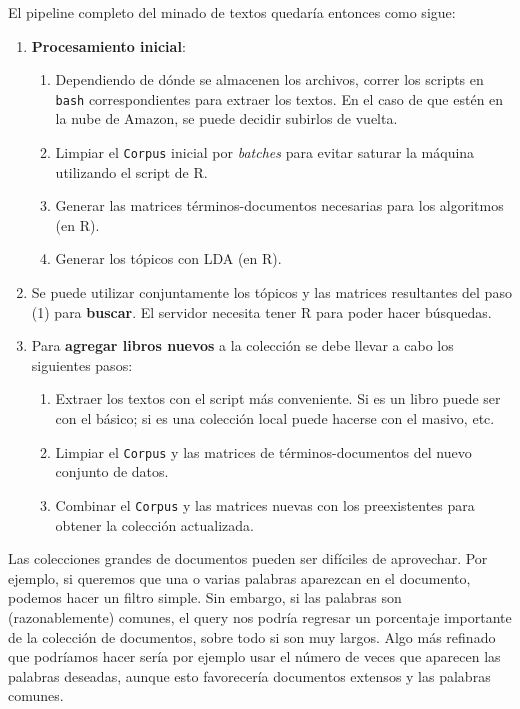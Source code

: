 El pipeline completo del minado de textos quedaría entonces como sigue:

\begin{enumerate}
\def\labelenumi{\arabic{enumi}.}
\itemsep1pt\parskip0pt
\item
  \textbf{Procesamiento inicial}:

  \begin{enumerate}
  \def\labelenumii{\alph{enumii}.}
  \itemsep1pt\parskip0pt
  \item
    Dependiendo de dónde se almacenen los archivos, correr los scripts
    en \texttt{bash} correspondientes para extraer los textos. En el
    caso de que estén en la nube de Amazon, se puede decidir subirlos de
    vuelta.
  \item
    Limpiar el \texttt{Corpus} inicial por \emph{batches} para evitar
    saturar la máquina utilizando el script de R.
  \item
    Generar las matrices términos-documentos necesarias para los
    algoritmos (en R).
  \item
    Generar los tópicos con LDA (en R).
  \end{enumerate}
\item
  Se puede utilizar conjuntamente los tópicos y las matrices resultantes
  del paso (1) para \textbf{buscar}. El servidor necesita tener R para
  poder hacer búsquedas.
\item
  Para \textbf{agregar libros nuevos} a la colección se debe llevar a
  cabo los siguientes pasos:

  \begin{enumerate}
  \def\labelenumii{\alph{enumii}.}
  \itemsep1pt\parskip0pt
  \item
    Extraer los textos con el script más conveniente. Si es un libro
    puede ser con el básico; si es una colección local puede hacerse con
    el masivo, etc.
  \item
    Limpiar el \texttt{Corpus} y las matrices de términos-documentos del
    nuevo conjunto de datos.
  \item
    Combinar el \texttt{Corpus} y las matrices nuevas con los
    preexistentes para obtener la colección actualizada.
  \end{enumerate}
\end{enumerate}




Las colecciones grandes de documentos pueden ser difíciles de aprovechar. Por ejemplo, si queremos que una o varias palabras aparezcan en el documento, podemos hacer un filtro simple. Sin embargo, si las palabras son (razonablemente) comunes, el query nos podría regresar un porcentaje importante de la colección de documentos, sobre todo si son muy largos. Algo más refinado que podríamos hacer sería por ejemplo usar el número de veces que aparecen las palabras deseadas, aunque esto favorecería documentos extensos y las palabras comunes.


